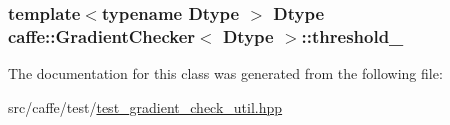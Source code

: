 \hypertarget{classcaffe_1_1_gradient_checker_a2488c7b9f076c4578ba47cea46f8e947}{
\subsubsection[{threshold\+\_\+}]{\setlength{\rightskip}{0pt plus 5cm}template$<$typename Dtype $>$ Dtype {\bf caffe\+::\+Gradient\+Checker}$<$ Dtype $>$\+::threshold\+\_\+\hspace{0.3cm}{\ttfamily [protected]}}}\label{classcaffe_1_1_gradient_checker_a2488c7b9f076c4578ba47cea46f8e947}


The documentation for this class was generated from the following file\+:\begin{DoxyCompactItemize}
\item 
src/caffe/test/\hyperlink{test__gradient__check__util_8hpp}{test\+\_\+gradient\+\_\+check\+\_\+util.\+hpp}\end{DoxyCompactItemize}
